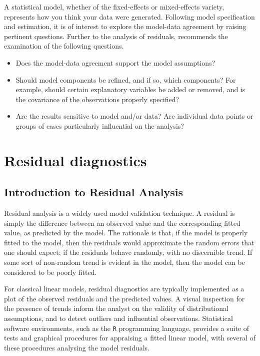 \documentclass[Main.tex]{subfiles}
\begin{document}
A statistical model, whether of the fixed-effects or mixed-effects variety, represents how you think your data were generated. Following model specification and estimation, it is of interest to explore the model-data
agreement by raising pertinent questions. Further to the analysis of residuals, \citet{schab} recommends the examination of the following questions.
\begin{itemize}
	\item Does the model-data agreement support the model assumptions?
	\item Should model components be refined, and if so, which components? For example, should certain explanatory variables
	be added or removed, and is the covariance of the observations properly specified?
	\item Are the results sensitive to model and/or data? Are individual data points or groups of cases particularly
	influential on the analysis?
\end{itemize}
\newpage
\section{Residual diagnostics} %
\subsection{Introduction to Residual Analysis}
Residual analysis is a widely used model validation technique. A residual is simply the difference between an observed value and the corresponding fitted value, as predicted by the model. The rationale is that, if the model is properly fitted to the model, then the residuals would approximate the random errors that one should expect; if the residuals behave randomly, with no discernible trend. If some sort of non-random trend is evident in the model, then the model can be considered to be poorly fitted.

For classical linear models, residual diagnostics are typically implemented as a plot of the observed residuals and the predicted values. A visual inspection for the presence of trends inform the analyst on the validity of distributional assumptions, and to detect outliers and influential observations. Statistical software environments, such as the \texttt{R} programming language, provides a suite of tests and graphical procedures for appraising a fitted linear model, with several 
of these procedures analysing the model residuals.
\end{document}
